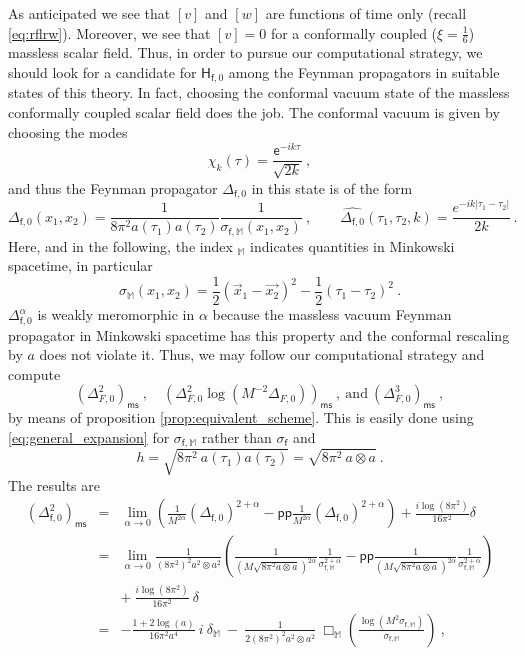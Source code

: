 \documentclass[12pt]{book}
\newcommand{\pp}{\mathsf{pp}}
\newcommand{\ms}{\mathsf{ms}}
\newcommand{\Mbb}{\mathbb{M}}
\newcommand{\Hsf}{\mathsf{H}}
\newcommand{\esf}{\mathsf{e}}
\newcommand{\fsf}{\mathsf{f}}
\theoremstyle{break}
\begin{document}
As anticipated we see that $[v]$ and $[w]$ are functions of time only (recall \eqref{eq:rflrw}). Moreover, we see that $[v]=0$ for a conformally coupled ($\xi=\frac16$) massless scalar field. Thus, in order to pursue our computational strategy, we should look for a candidate for $\Hsf_{\fsf,0}$ among the Feynman propagators in suitable states of this theory. In fact, choosing the conformal vacuum state of the massless conformally coupled scalar field does the job. The conformal vacuum is given by choosing the modes
%
\begin{equation*}
\chi_k(\tau) = \frac{\esf^{-ik\tau}}{\sqrt{2k}} \ , 
\end{equation*}
%
and thus the Feynman propagator $\Delta_{\fsf,0}$ in this state is of the form
%
\begin{equation*}
\Delta_{\fsf,0}(x_1,x_2)=\frac{1}{8\pi^2 a(\tau_1)a(\tau_2)}\frac{1}{\sigma_{\fsf,\mathbb{M}}(x_1,x_2)} \ , \qquad 
\widehat{\Delta_{\fsf,0}}(\tau_1,\tau_2,k)=\frac{e^{-ik|\tau_1-\tau_2|}}{2k}\,.
\end{equation*}
%
Here, and in the following, the index $_{\Mbb}$ indicates quantities in Minkowski spacetime, in particular 
%
\begin{equation*}
\sigma_{\Mbb}(x_1,x_2) = \frac12 \left(\vec{x}_1-\vec{x_2}\right)^2 - \frac12 \left(\tau_1-\tau_2\right)^2 \ . 
\end{equation*}
%
$\Delta^\alpha_{\fsf,0}$ is weakly meromorphic in $\alpha$ because the massless vacuum Feynman propagator in Minkowski spacetime has this property and the conformal rescaling by $a$ does not violate it. Thus, we may follow our computational strategy and compute
%
\begin{equation*}
\left(\Delta^2_{F,0}\right)_\ms \ , \quad \left(\Delta^2_{F,0}\log\left(M^{-2}\Delta_{F,0}\right)\right)_\ms \ , \ \mbox{and} \ \left(\Delta^3_{F,0}\right)_\ms \ ,
\end{equation*}
%
by means of proposition \ref{prop:equivalent_scheme}. This is easily done using \eqref{eq:general_expansion} for $\sigma_{\fsf,\Mbb}$ rather than $\sigma_\fsf$ and
%
\begin{equation*}
h = \sqrt{8 \pi^2 \ a(\tau_1)a(\tau_2)} = \sqrt{8\pi^2 \  a\otimes a} \ . 
\end{equation*}
%
The results are
%
\begin{eqnarray*}
(\Delta_{\fsf,0}^2)_\ms &=& \lim_{\alpha\to 0} \left( \frac{1}{M^{2\alpha}}(\Delta_{\fsf,0})^{2+\alpha} - \pp\frac{1}{M^{2\alpha}}(\Delta_{\fsf,0})^{2+\alpha} \right) + \frac{i\log(8\pi^2)}{16\pi^2} \delta \\
&=& \lim_{\alpha\to 0} \frac{1}{(8\pi^2)^2 a^2\otimes a^2} \left(\frac{1}{(M\sqrt{8\pi^2 a\otimes a})^{2\alpha}}\frac{1}{\sigma_{\fsf,\mathbb{M}}^{2+\alpha}}-\pp \frac{1}{(M\sqrt{8\pi^2 a\otimes a})^{2\alpha}}\frac{1}{\sigma_{\fsf,\mathbb{M}}^{2+\alpha}}\right) \\
&& + \ \frac{i\log(8\pi^2)}{16\pi^2} \ \delta \\
&=& - \frac{1+2\log (a)}{16\pi^2 a^4} \ i \ \delta_\mathbb{M} \ - \ \frac{1}{2(8\pi^2)^2 a^2\otimes a^2} \ \Box_{\mathbb{M}}\left(\frac{\log\left(M^2\sigma_{\fsf,\mathbb{M}}\right)}{\sigma_{\fsf,\mathbb{M}}}\right) \ ,
\end{eqnarray*}
\end{document}

